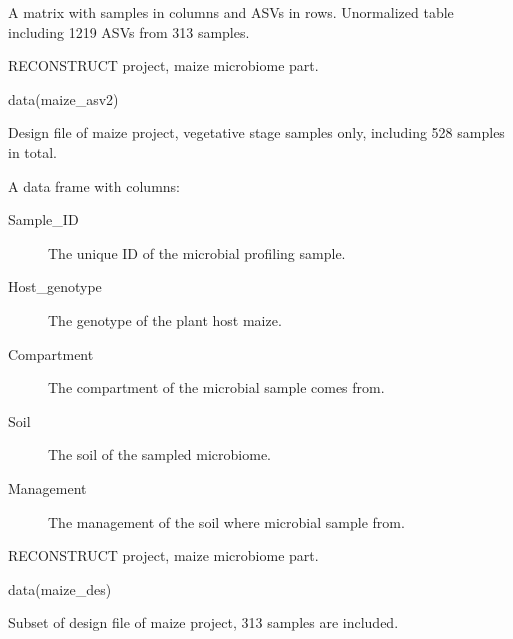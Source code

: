 \documentclass[a4paper]{book}
\begin{document}
%
\begin{Format}
A matrix with samples in columns and ASVs in rows. Unormalized table
including 1219 ASVs from 313 samples.
\end{Format}
%
\begin{Source}\relax
RECONSTRUCT project, maize microbiome part.
\end{Source}
%
\begin{Examples}
\begin{ExampleCode}
data(maize_asv2)

\end{ExampleCode}
\end{Examples}
%
\begin{Description}\relax
Design file of maize project, vegetative stage samples only, including 528
samples in total.
\end{Description}
%
\begin{Format}
A data frame with columns:
\begin{description}

\item[Sample\_ID] The unique ID of the microbial profiling sample.
\item[Host\_genotype] The genotype of the plant host maize.
\item[Compartment] The compartment of the microbial sample comes from.
\item[Soil] The soil of the sampled microbiome.
\item[Management] The management of the soil where microbial sample from.

\end{description}

\end{Format}
%
\begin{Source}\relax
RECONSTRUCT project, maize microbiome part.
\end{Source}
%
\begin{Examples}
\begin{ExampleCode}
data(maize_des)

\end{ExampleCode}
\end{Examples}
%
\begin{Description}\relax
Subset of design file of maize project, 313 samples are included.
\end{Description}
\end{document}
